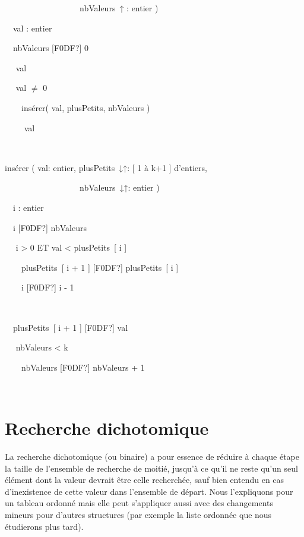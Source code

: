 {\sffamily
\ \ \ \ \ \ \ \ \ \ \ \ \ \ \ \ \ \ nbValeurs~↑ : entier )}

{\sffamily
\ \ val : entier}

{\sffamily
\ \ nbValeurs \textrm{[F0DF?]} 0}

{\sffamily
\ \  val}

{\sffamily
\ \   val ${\neq}$ 0
}

{\sffamily
\ \ \ \ insérer( val, plusPetits, nbValeurs )}

{\sffamily
\ \ \ \  val}

{\sffamily
\ \   }

{\sffamily
{} }


\bigskip

{\sffamily
{} insérer ( val: entier, plusPetits~↓↑:
 [ 1 à k+1 ] d’entiers, }

{\sffamily
\ \ \ \ \ \ \ \ \ \ \ \ \ \ \ \ \ \ nbValeurs~↓↑: entier )}

{\sffamily
\ \ i : entier}

{\sffamily
\ \ i \textrm{[F0DF?]} nbValeurs}

{\sffamily
\ \   i {\textgreater} 0 ET val
{\textless} plusPetits~[ i ] }

{\sffamily
\ \ \ \ plusPetits~{[ i + 1 ]
}\textrm{[F0DF?]}{ plusPetits~[ i ]}}

{\sffamily
{\ \ \ \ }i \textrm{[F0DF?]} i - 1}

{\sffamily
\ \   }

{\sffamily
\ \ plusPetits~{[ i + 1 ]
}\textrm{[F0DF?]}{ val}}

{\sffamily
\ \  nbValeurs {\textless} k
\ \ \ \ \ \ \ \ \ \ }

{\sffamily
\ \ \ \ nbValeurs{
}\textrm{[F0DF?]}{ }nbValeurs + 1}

{\sffamily
\ \  }

{\sffamily
{} }

\section{Recherche dichotomique}
{
La recherche dichotomique (ou binaire) a pour essence de réduire à
chaque étape la taille de l’ensemble de recherche de moitié, jusqu’à ce
qu’il ne reste qu’un seul élément dont la valeur devrait être celle
recherchée, sauf bien entendu en cas d’inexistence de cette valeur dans
l’ensemble de départ. Nous l’expliquons pour un tableau ordonné mais
elle peut s’appliquer aussi avec des changements mineurs pour
d'autres structures (par exemple la liste ordonnée que
nous étudierons plus tard).}

